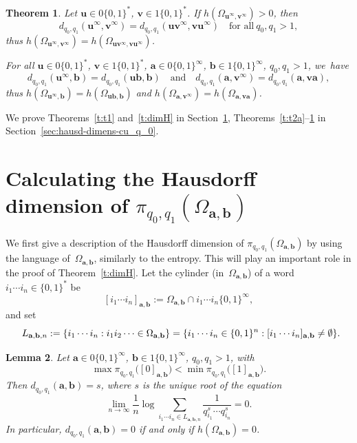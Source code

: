 \documentclass{amsart}
\newtheorem{theorem}{Theorem}[section]
\newtheorem{lemma}[theorem]{Lemma}
\theoremstyle{definition}
\numberwithin{equation}{section}
\newcommand{\ba}{\mathbf{a}}
\newcommand{\bb}{\mathbf{b}}
\newcommand{\bu}{\mathbf{u}}
\newcommand{\bv}{\mathbf{v}}
\begin{document}
\begin{theorem} \label{t:equaldim}
Let $\bu \in 0\{0,1\}^*$, $\bv \in 1\{0,1\}^*$.
If $h(\Omega_{\bu^\infty,\bv^\infty}) > 0$, then
\begin{equation} \label{e:equaldimuv} d_{q_0,q_1}(\bu^\infty,\bv^\infty) = d_{q_0,q_1}(\bu\bv^\infty,\bv\bu^\infty) \quad \mbox{for all}\ q_0,q_1 > 1,
\end{equation}
thus $h(\Omega_{\bu^\infty,\bv^\infty}) = h(\Omega_{\bu\bv^\infty,\bv\bu^\infty})$.   

For all $\bu \in 0\{0,1\}^*$\!, $\bv \in 1\{0,1\}^*$\!, $\ba \in 0\{0,1\}^\infty$\!, $\bb \in 1\{0,1\}^\infty$\!, $q_0,q_1 > 1$, we~have
\[
d_{q_0,q_1}(\bu^\infty,\bb) = d_{q_0,q_1}(\bu\bb,\bb) \quad \mbox{and} \quad d_{q_0,q_1}(\ba,\bv^\infty) = d_{q_0,q_1}(\ba,\bv\ba),
\]
thus $h(\Omega_{\bu^\infty,\bb}) = h(\Omega_{\bu\bb,\bb})$ and $h(\Omega_{\ba,\bv^\infty}) = h(\Omega_{\ba,\bv\ba})$.
\end{theorem}

We prove Theorems~\ref{t:t1} and~\ref{t:dimH} in Section~\ref{sec:calc-hausd-dimens}, Theorems~\ref{t:t2a}--\ref{t:equaldim} in Section~\ref{sec:hausd-dimens-cu_q_0}.

\section{Calculating the Hausdorff dimension of $\pi_{q_0,q_1}(\Omega_{\ba,\bb})$} \label{sec:calc-hausd-dimens}
We first give a description of the Hausdorff dimension of $\pi_{q_0,q_1}(\Omega_{\ba,\bb})$ by using the language of~$\Omega_{\ba,\bb}$, similarly to the entropy. 
This will play an important role in the proof of Theorem~\ref{t:dimH}.
Let the cylinder (in~$\Omega_{\ba,\bb}$) of a word $i_1\cdots i_n \in \{0,1\}^*$ be
\[
[i_1\cdots i_n]_{\ba,\bb} := \Omega_{\ba,\bb} \cap i_1 \cdots i_n \{0,1\}^\infty,
\]
and set
\begin{equation} \label{e:Labn}
L_{\ba,\bb,n} := \{i_1\cdots i_n : i_1i_2 \cdots \in \Omega_{\ba,\bb}\} = \{i_1\cdots i_n \in \{0,1\}^n : [i_1\cdots i_n]_{\ba,\bb} \ne \emptyset\}.\hspace{-.5em}
\end{equation}

\begin{lemma} \label{l:Barreira}
Let $\ba \in 0\{0,1\}^\infty$, $\bb \in 1\{0,1\}^\infty$, $q_0,q_1>1$, with
\begin{equation} \label{e:maxmin}
\max \pi_{q_0,q_1}\big([0]_{\ba,\bb}\big) < \min \pi_{q_0,q_1}\big([1]_{\ba,\bb}\big).
\end{equation}
Then $d_{q_0,q_1}(\ba,\bb) = s$, where $s$ is the unique root of the equation
\begin{equation} \label{e:hausdoffD2}
\lim_{n\to\infty} \frac{1}{n} \log \sum_{i_1\cdots i_n\in L_{\ba,\bb,n}} \frac{1}{q_{i_1}^s\cdots q_{i_n}^s} = 0.
\end{equation}
In particular, $d_{q_0,q_1}(\ba,\bb) = 0$ if and only if $h(\Omega_{\ba,\bb}) = 0$. 
\end{lemma}
\end{document}
